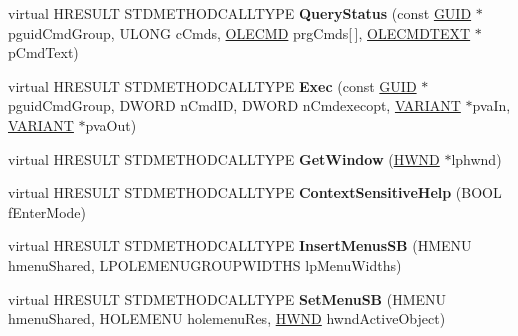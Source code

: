 \begin{DoxyCompactItemize}
\item 
\mbox{\label{class_c_shell_browser_a04c7ea1a2c980dad9f1bb6346875fcf7}} 
virtual H\+R\+E\+S\+U\+LT S\+T\+D\+M\+E\+T\+H\+O\+D\+C\+A\+L\+L\+T\+Y\+PE {\bfseries Query\+Status} (const \hyperlink{interface_g_u_i_d}{G\+U\+ID} $\ast$pguid\+Cmd\+Group, U\+L\+O\+NG c\+Cmds, \hyperlink{struct_i_ole_command_target_1_1__tag_o_l_e_c_m_d}{O\+L\+E\+C\+MD} prg\+Cmds\mbox{[}$\,$\mbox{]}, \hyperlink{struct_i_ole_command_target_1_1__tag_o_l_e_c_m_d_t_e_x_t}{O\+L\+E\+C\+M\+D\+T\+E\+XT} $\ast$p\+Cmd\+Text)
\item 
\mbox{\label{class_c_shell_browser_a9f00c299f5eb6907c0a88d87bd6e813a}} 
virtual H\+R\+E\+S\+U\+LT S\+T\+D\+M\+E\+T\+H\+O\+D\+C\+A\+L\+L\+T\+Y\+PE {\bfseries Exec} (const \hyperlink{interface_g_u_i_d}{G\+U\+ID} $\ast$pguid\+Cmd\+Group, D\+W\+O\+RD n\+Cmd\+ID, D\+W\+O\+RD n\+Cmdexecopt, \hyperlink{structtag_v_a_r_i_a_n_t}{V\+A\+R\+I\+A\+NT} $\ast$pva\+In, \hyperlink{structtag_v_a_r_i_a_n_t}{V\+A\+R\+I\+A\+NT} $\ast$pva\+Out)
\item 
\mbox{\label{class_c_shell_browser_ae3371c3e67bc8e38594db475d0bcdcdd}} 
virtual H\+R\+E\+S\+U\+LT S\+T\+D\+M\+E\+T\+H\+O\+D\+C\+A\+L\+L\+T\+Y\+PE {\bfseries Get\+Window} (\hyperlink{interfacevoid}{H\+W\+ND} $\ast$lphwnd)
\item 
\mbox{\label{class_c_shell_browser_a120909fce2a8b216560f384b6eb4261d}} 
virtual H\+R\+E\+S\+U\+LT S\+T\+D\+M\+E\+T\+H\+O\+D\+C\+A\+L\+L\+T\+Y\+PE {\bfseries Context\+Sensitive\+Help} (B\+O\+OL f\+Enter\+Mode)
\item 
\mbox{\label{class_c_shell_browser_aaa522b6493d99f1fa85dd45e9a5b9330}} 
virtual H\+R\+E\+S\+U\+LT S\+T\+D\+M\+E\+T\+H\+O\+D\+C\+A\+L\+L\+T\+Y\+PE {\bfseries Insert\+Menus\+SB} (H\+M\+E\+NU hmenu\+Shared, L\+P\+O\+L\+E\+M\+E\+N\+U\+G\+R\+O\+U\+P\+W\+I\+D\+T\+HS lp\+Menu\+Widths)
\item 
\mbox{\label{class_c_shell_browser_a0e44aa374b41949345b0154a08d99c92}} 
virtual H\+R\+E\+S\+U\+LT S\+T\+D\+M\+E\+T\+H\+O\+D\+C\+A\+L\+L\+T\+Y\+PE {\bfseries Set\+Menu\+SB} (H\+M\+E\+NU hmenu\+Shared, H\+O\+L\+E\+M\+E\+NU holemenu\+Res, \hyperlink{interfacevoid}{H\+W\+ND} hwnd\+Active\+Object)

\end{DoxyCompactItemize}
